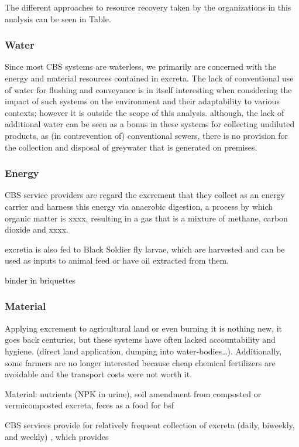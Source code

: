 \documentclass[sustainability,article,submit,moreauthors,pdftex,10pt,a4paper]{mdpi}
\theoremstyle{mdpi}
\newcounter{ex}
\newcounter{re}
\theoremstyle{mdpidefinition}
\begin{document}
The different approaches to resource recovery taken by the organizations in this analysis can be seen in Table.



\subsubsection*{Water}
Since most CBS systems are waterless, we primarily are concerned with the energy and material resources contained in excreta. The lack of conventional use of water for flushing and conveyance is in itself interesting when considering the impact of such systems on the environment and their adaptability to various contexts; however it is outside the scope of this analysis. although, the lack of additional water can be seen as a bonus in these systems for collecting undiluted products, as (in contrevention of) conventional sewers, there is no provision for the collection and disposal of greywater that is generated on premises. \cite{Tilmans2015} 

\subsubsection*{Energy}
CBS service providers are regard the excrement that they collect as an energy carrier and harness this energy via anaerobic digestion, a process by which organic matter is xxxx, resulting in a gas that is a mixture of methane, carbon dioxide and xxxx.  

excretia is also fed to Black Soldier fly larvae, which are harvested and can be used as inputs to animal feed or have oil extracted from them. 

binder in briquettes



\subsubsection*{Material}
Applying excrement to agricultural land or even burning it is nothing new, it goes back centuries, but these systems have often lacked accountability and hygiene. (direct land application, dumping into water-bodies…). Additionally, some farmers are no longer interested because cheap chemical fertilizers are avoidable and the transport costs were not worth it.

Material: nutrients (NPK in urine), soil amendment from composted or vermicomposted excreta, feces as a food for bsf
 
  CBS services provide for relatively frequent collection of excreta (daily, biweekly, and weekly) , which provides 
  
\end{document}
